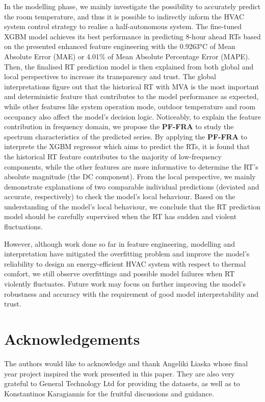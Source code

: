 \documentclass[11pt]{article}
\begin{document}
In the modelling phase, we mainly investigate the possibility to accurately predict the room temperature, and thus it is possible to indirectly inform the HVAC system control strategy to realise a half-autonomous system. The fine-tuned XGBM model achieves its best performance in predicting 8-hour ahead RTs based on the presented enhanced feature engineering with the 0.9263°C of Mean Absolute Error (MAE) or 4.01\% of Mean Absolute Percentage Error (MAPE). Then, the finalised RT prediction model is then explained from both global and local perspectives to increase its transparency and trust. The global interpretations figure out that the historical RT with MVA is the most important and deterministic feature that contributes to the model performance as expected, while other features like system operation mode, outdoor temperature and room occupancy also affect the model’s decision logic. Noticeably, to explain the feature contribution in frequency domain, we propose the \textbf{PF-FRA} to study the spectrum characteristics of the predicted series. By applying the \textbf{PF-FRA} to interprete the XGBM regressor which aims to predict the RTs, it is found that the historical RT feature contributes to the majority of low-frequency components, while the other features are more informative to determine the RT’s absolute magnitude (the DC component). From the local perspective, we mainly demonstrate explanations of two comparable individual predictions (deviated and accurate, respectively) to check the model’s local behaviour. Based on the understanding of the model’s local behaviour, we conclude that the RT prediction model should be carefully supervised when the RT has sudden and violent fluctuations.

However, although work done so far in feature engineering, modelling and interpretation have mitigated the overfitting problem and improve the model’s reliability to design an energy-efficient HVAC system with respect to thermal comfort, we still observe overfittings and possible model failures when RT violently fluctuates. Future work may focus on further improving the model’s robustness and accuracy with the requirement of good model interpretability and trust.

\section*{Acknowledgements}
The authors would like to acknowledge and thank Angeliki Liaska whose final year project inspired the work presented in this paper. They are also very grateful to General Technology Ltd for providing the datasets, as well as to Konstantinos Karagiannis for the fruitful discussions and guidance.
\end{document}
